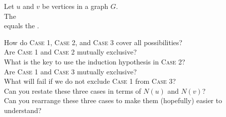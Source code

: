 
\begin{frame}
  \begin{theorem}
    \begin{center}
      Let $u$ and $v$ be  vertices in a graph $G$. \\[5pt]
      The  \\
      equals the .
    \end{center}
  \end{theorem}

  \pause
  \begin{center}
    How do \textsc{Case 1}, \textsc{Case 2}, and \textsc{Case 3} cover all possibilities? \\[8pt] \pause
    Are \textsc{Case 1} and \textsc{Case 2} mutually exclusive? \\[4pt] \pause
    What is the key to use the induction hypothesis in \textsc{Case 2}? \\[8pt] \pause
    Are \textsc{Case 1} and \textsc{Case 3} mutually exclusive? \\[4pt] \pause
    What will fail if we do not exclude \textsc{Case 1} from \textsc{Case 3}? \\[8pt] \pause
    Can you restate these three cases in terms of $N(u)$ and $N(v)$? \\[4pt] \pause
    Can you rearrange these three cases to make them (hopefully) easier to understand?
  \end{center}
\end{frame}

